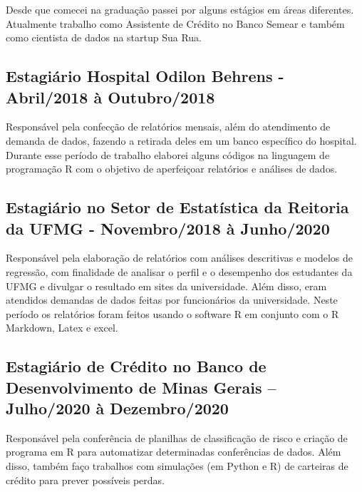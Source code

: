 \documentclass[
]{book}
\begin{document}
Desde que comecei na graduação passei por alguns estágios em áreas diferentes. Atualmente trabalho como Assistente de Crédito no Banco Semear e também como cientista de dados na startup Sua Rua.

\hypertarget{estagiuxe1rio-hospital-odilon-behrens---abril2018-uxe0-outubro2018}{%
\subsection{Estagiário Hospital Odilon Behrens - Abril/2018 à Outubro/2018}\label{estagiuxe1rio-hospital-odilon-behrens---abril2018-uxe0-outubro2018}}

Responsável pela confecção de relatórios mensais, além do atendimento de demanda de dados, fazendo a retirada deles em um banco específico do hospital. Durante esse período de trabalho elaborei alguns códigos na linguagem de programação R com o objetivo de aperfeiçoar relatórios e análises de dados.

\hypertarget{estagiuxe1rio-no-setor-de-estatuxedstica-da-reitoria-da-ufmg---novembro2018-uxe0-junho2020}{%
\subsection{Estagiário no Setor de Estatística da Reitoria da UFMG - Novembro/2018 à Junho/2020}\label{estagiuxe1rio-no-setor-de-estatuxedstica-da-reitoria-da-ufmg---novembro2018-uxe0-junho2020}}

Responsável pela elaboração de relatórios com análises descritivas e modelos de regressão, com finalidade de analisar o perfil e o desempenho dos estudantes da UFMG e divulgar o resultado em sites da universidade. Além disso, eram atendidos demandas de dados feitas por funcionários da universidade. Neste período os relatórios foram feitos usando o software R em conjunto com o R Markdown, Latex e excel.

\hypertarget{estagiuxe1rio-de-cruxe9dito-no-banco-de-desenvolvimento-de-minas-gerais-julho2020-uxe0-dezembro2020}{%
\subsection{Estagiário de Crédito no Banco de Desenvolvimento de Minas Gerais -- Julho/2020 à Dezembro/2020}\label{estagiuxe1rio-de-cruxe9dito-no-banco-de-desenvolvimento-de-minas-gerais-julho2020-uxe0-dezembro2020}}

Responsável pela conferência de planilhas de classificação de risco e criação de programa em R para automatizar determinadas conferências de dados. Além disso, também faço trabalhos com simulações (em Python e R) de carteiras de crédito para prever possíveis perdas.
\end{document}

